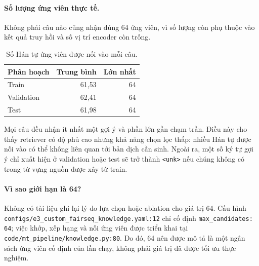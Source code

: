 \documentclass[11pt]{article}
\begin{document}
\paragraph{Số lượng ứng viên thực tế.}
Không phải câu nào cũng nhận đúng 64 ứng viên, vì số lượng còn phụ thuộc vào
kết quả truy hồi và số vị trí encoder còn trống.
\begin{table}[H]
  \centering
  \small
  \caption{Số Hán tự ứng viên được nối vào mỗi câu.}
  \label{tab:qa-e3-candidates}
  \begin{tabular}{lrr}
    \toprule
    Phân hoạch & Trung bình & Lớn nhất \\
    \midrule
    Train & 61,53 & 64 \\
    Validation & 62,41 & 64 \\
    Test & 61,98 & 64 \\
    \bottomrule
  \end{tabular}
\end{table}
Mọi câu đều nhận ít nhất một gợi ý và phần lớn gần chạm trần. Điều này cho
thấy retriever có độ phủ cao nhưng khả năng chọn lọc thấp: nhiều Hán tự được
nối vào có thể không liên quan tới bản dịch cần sinh. Ngoài ra, một số ký tự
gợi ý chỉ xuất hiện ở validation hoặc test sẽ trở thành \texttt{<unk>} nếu
chúng không có trong từ vựng nguồn được xây từ train.

\paragraph{Vì sao giới hạn là 64?}
Không có tài liệu ghi lại lý do lựa chọn hoặc ablation cho giá trị 64. Cấu hình
\texttt{configs/e3\_custom\_fairseq\_knowledge.yaml:12} chỉ cố định
\texttt{max\_candidates: 64}; việc khớp, xếp hạng và nối ứng viên được triển
khai tại \texttt{code/mt\_pipeline/knowledge.py:80}. Do đó, 64 nên được mô tả
là một ngân sách ứng viên cố định của lần chạy, không phải giá trị đã được tối
ưu thực nghiệm.
\end{document}
